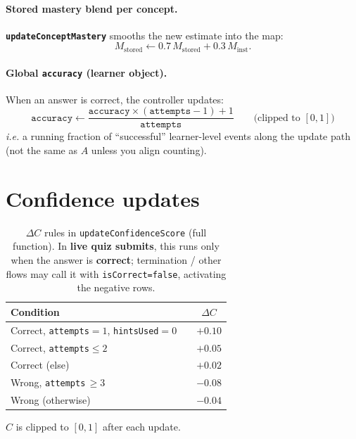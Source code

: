 \documentclass[12pt,a4paper]{article}
\begin{document}
\paragraph{Stored mastery blend per concept.}
\label{sec:blend}
\textbf{\texttt{updateConceptMastery}} smooths the new estimate into the map:
\begin{equation}
M_{\mathrm{stored}} \leftarrow 0.7\,M_{\mathrm{stored}} + 0.3\,M_{\mathrm{inst}} .
\label{eq:blend}
\end{equation}

\paragraph{Global \texttt{accuracy} (learner object).}
When an answer is correct, the controller updates:
\begin{equation}
\texttt{accuracy} \leftarrow \frac{\texttt{accuracy}\times(\texttt{attempts}-1) + 1}{\texttt{attempts}}
\qquad\text{(clipped to $[0,1]$)}
\label{eq:acclearner}
\end{equation}
\textit{i.e.} a running fraction of ``successful'' learner-level events along the update path (not the same as $A$ unless you align counting).

\section{Confidence updates}

\begin{table}[htbp]
\centering
\caption{$\Delta C$ rules in \texttt{updateConfidenceScore} (full function). In \textbf{live quiz submits}, this runs only when the answer is \textbf{correct}; termination / other flows may call it with \texttt{isCorrect=false}, activating the negative rows.}
\label{tab:conf}
\renewcommand{\arraystretch}{1.4}
\setlength{\tabcolsep}{10pt}
\begin{tabular}{@{}l l c@{}}
\toprule
Condition & & $\Delta C$ \\
\midrule
Correct, \texttt{attempts}$=1$, \texttt{hintsUsed}$=0$ & & $+0.10$ \\
Correct, \texttt{attempts}$\le 2$ & & $+0.05$ \\
Correct (else) & & $+0.02$ \\
\rowcolor{rowhighlight}
Wrong, \texttt{attempts}\,$\ge 3$ & & $-0.08$ \\
Wrong (otherwise) & & $-0.04$ \\
\bottomrule
\end{tabular}
\end{table}
$C$ is clipped to $[0,1]$ after each update.
\end{document}
